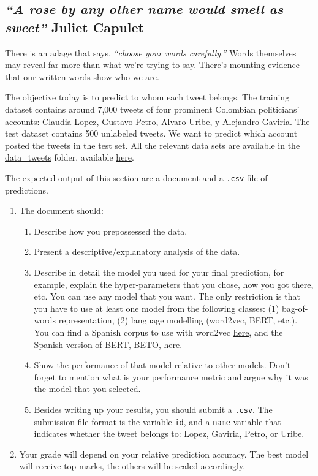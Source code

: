 \documentclass[12pt,onecolumn]{article}
\begin{document}
\subsection{{\it ``A rose by any other name would smell as sweet''} Juliet Capulet}

There is an adage that says, {\it “choose your words carefully.”} Words themselves may reveal far more than what we’re trying to say. There’s mounting evidence that our written words show who we are.

The objective today is to predict to whom each tweet belongs. The training dataset contains around 7,000 tweets of four prominent Colombian politicians' accounts: Claudia Lopez, Gustavo Petro, Alvaro Uribe, y Alejandro Gaviria. The test dataset contains 500 unlabeled tweets. We want to predict which account posted the tweets in the test set. All the relevant data sets are available in the \href{https://www.dropbox.com/s/gewpk6r1ii9u5h3/data_tweets.zip?dl=0}{data\_tweets} folder, available \href{https://www.dropbox.com/s/gewpk6r1ii9u5h3/data_tweets.zip?dl=0}{here}.


The expected output of this section are a document and a \texttt{.csv} file of predictions. 

\begin{enumerate}
  \item  The document should:
  \begin{enumerate}
    \item Describe how you prepossessed the data.
    \item Present a descriptive/explanatory analysis of the data.
    \item Describe in detail the model you used for your final prediction, for example, explain the hyper-parameters that you chose, how you got there, etc.  You can use any model that you want. The only restriction is that you have to use at least one model from the following classes: (1) bag-of-words representation, (2) language modelling (word2vec, BERT, etc.). You can find a Spanish corpus to use with word2vec \href{https://crscardellino.ar/SBWCE/}{here}, and the Spanish version of BERT, BETO, \href{https://github.com/dccuchile/beto}{here}.
    \item Show the performance of that model relative to other models. Don't forget to mention what is your performance metric and argue why it was the model that you selected.
    \item Besides writing up your results, you should submit a \texttt{.csv}. The submission file format is the variable \texttt{id}, and a \texttt{name} variable that indicates whether the tweet belongs to: Lopez, Gaviria, Petro, or Uribe. 
  \end{enumerate}
  \item Your grade will depend on your relative prediction accuracy. The best model will receive top marks, the others will be scaled accordingly.
  
\end{enumerate}
\end{document}
